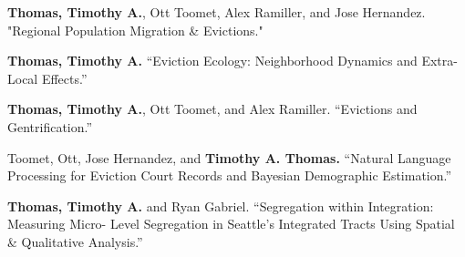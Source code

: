 \begin{cvparagraph}

\textbf{Thomas, Timothy A.}, Ott Toomet, Alex Ramiller, and Jose Hernandez. "Regional Population Migration \& Evictions."
\end{cvparagraph}



\begin{cvparagraph}


\textbf{Thomas, Timothy A.} “Eviction Ecology: Neighborhood Dynamics and Extra-Local Effects.”

\end{cvparagraph}

\begin{cvparagraph}

\textbf{Thomas, Timothy A.}, Ott Toomet, and Alex Ramiller. “Evictions and Gentrification.”
\end{cvparagraph}

\begin{cvparagraph}

Toomet, Ott, Jose Hernandez, and \textbf{Timothy A. Thomas.} “Natural Language Processing for Eviction Court Records and Bayesian Demographic Estimation.”
\end{cvparagraph}



\begin{cvparagraph}

\textbf{Thomas, Timothy A.} and Ryan Gabriel. “Segregation within Integration: Measuring Micro- Level Segregation in Seattle's Integrated Tracts Using Spatial \& Qualitative Analysis.”
\end{cvparagraph}

